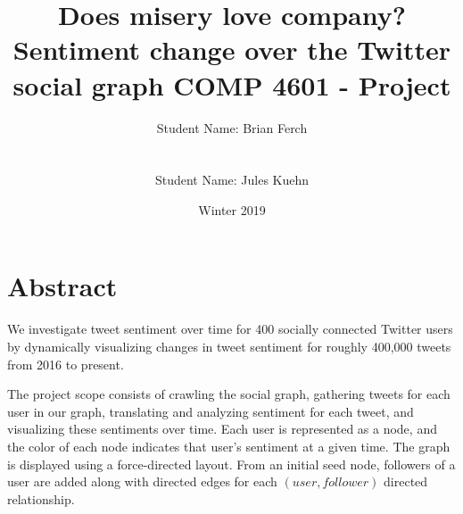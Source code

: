 \documentclass[12pt]{article}
\begin{document}
\title {
    Does misery love company?\\
    Sentiment change over the Twitter social graph\newline\newline
    \large COMP 4601 - Project}
\author{Student Name: Brian Ferch\\
\\\\ 
Student Name: Jules Kuehn\\
}
\date{Winter 2019}
\maketitle


% 



\section{Abstract}

We investigate tweet sentiment over time for 400 socially connected Twitter users by dynamically visualizing changes in tweet sentiment for roughly 400,000 tweets from 2016 to present.\newline

The project scope consists of crawling the social graph, gathering tweets for each user in our graph, translating and analyzing sentiment for each tweet, and visualizing these sentiments over time. Each user is represented as a node, and the color of each node indicates that user’s sentiment at a given time. The graph is displayed using a force-directed layout. From an initial seed node, followers of a user are added along with directed edges for each $(user, follower)$ directed relationship.
\end{document}
